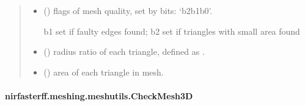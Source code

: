 \documentclass[letterpaper,10pt,english]{sphinxmanual}
\begin{document}
\begin{fulllineitems}
\begin{quote}
\begin{description}
\sphinxAtStartPar
\begin{itemize}
\item {} 
\sphinxAtStartPar
{} () \textendash{} flags of mesh quality, set by bits: ‘b2b1b0’.

\sphinxAtStartPar
b1 set if faulty edges found; b2 set if triangles with small area found

\item {} 
\sphinxAtStartPar
{} () \textendash{} radius ratio of each triangle, defined as .

\item {} 
\sphinxAtStartPar
{} () \textendash{} area of each triangle in mesh.

\end{itemize}


\end{description}\end{quote}

\end{fulllineitems}


\sphinxstepscope


\paragraph{nirfasterff.meshing.meshutils.CheckMesh3D}
\label{\detokenize{_autosummary/nirfasterff.meshing.meshutils.CheckMesh3D:nirfasterff-meshing-meshutils-checkmesh3d}}\label{\detokenize{_autosummary/nirfasterff.meshing.meshutils.CheckMesh3D::doc}}
\end{document}
